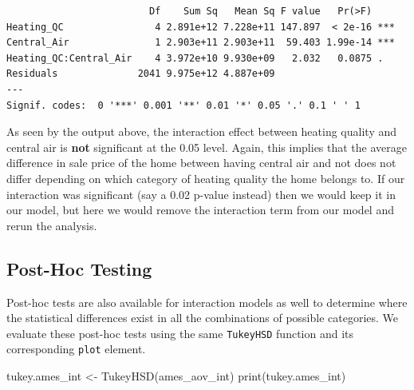 \documentclass[
  letterpaper,
  DIV=11,
  numbers=noendperiod]{scrreprt}
\newenvironment{Shaded}{\begin{snugshade}}{\end{snugshade}}
\newcommand{\FunctionTok}[1]{\textcolor[rgb]{0.28,0.35,0.67}{#1}}
\newcommand{\NormalTok}[1]{\textcolor[rgb]{0.00,0.23,0.31}{#1}}
\newcommand{\OtherTok}[1]{\textcolor[rgb]{0.00,0.23,0.31}{#1}}
\begin{document}
\begin{verbatim}
                         Df    Sum Sq   Mean Sq F value   Pr(>F)    
Heating_QC                4 2.891e+12 7.228e+11 147.897  < 2e-16 ***
Central_Air               1 2.903e+11 2.903e+11  59.403 1.99e-14 ***
Heating_QC:Central_Air    4 3.972e+10 9.930e+09   2.032   0.0875 .  
Residuals              2041 9.975e+12 4.887e+09                     
---
Signif. codes:  0 '***' 0.001 '**' 0.01 '*' 0.05 '.' 0.1 ' ' 1
\end{verbatim}

As seen by the output above, the interaction effect between heating
quality and central air is \textbf{not} significant at the 0.05 level.
Again, this implies that the average difference in sale price of the
home between having central air and not does not differ depending on
which category of heating quality the home belongs to. If our
interaction was significant (say a 0.02 p-value instead) then we would
keep it in our model, but here we would remove the interaction term from
our model and rerun the analysis.

\hypertarget{post-hoc-testing-1}{%
\subsection{Post-Hoc Testing}\label{post-hoc-testing-1}}

Post-hoc tests are also available for interaction models as well to
determine where the statistical differences exist in all the
combinations of possible categories. We evaluate these post-hoc tests
using the same \texttt{TukeyHSD} function and its corresponding
\texttt{plot} element.

\begin{Shaded}
\begin{Highlighting}[]
\NormalTok{tukey.ames\_int }\OtherTok{\textless{}{-}} \FunctionTok{TukeyHSD}\NormalTok{(ames\_aov\_int)}
\FunctionTok{print}\NormalTok{(tukey.ames\_int)}
\end{Highlighting}
\end{Shaded}
\end{document}
